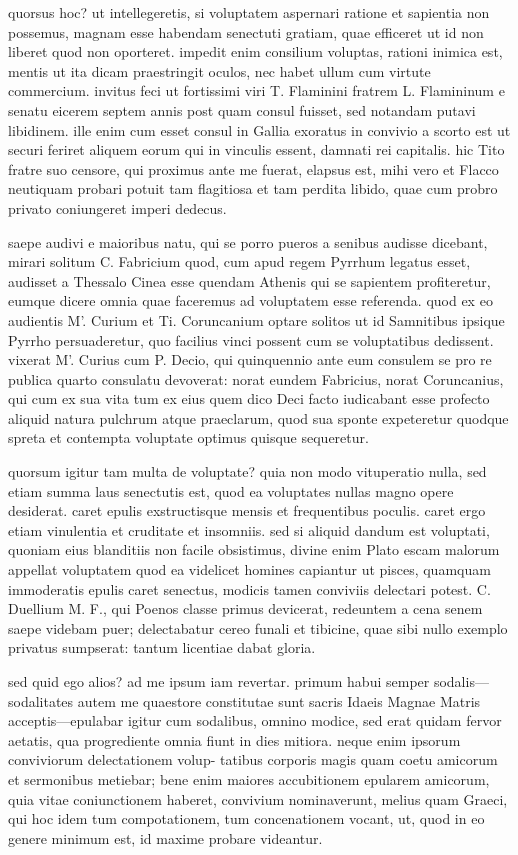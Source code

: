  quorsus hoc? ut intellegeretis, si voluptatem aspernari ratione et sapientia non possemus, magnam esse habendam senectuti gratiam, quae efficeret ut id non liberet quod non oporteret. impedit enim consilium voluptas, rationi inimica est, mentis ut ita dicam praestringit oculos, nec habet ullum cum virtute commercium. invitus feci ut fortissimi viri T. Flaminini fratrem L. Flamininum e senatu eicerem septem annis post quam consul fuisset, sed notandam putavi libidinem. ille enim cum esset consul in Gallia exoratus in convivio a scorto est ut securi feriret aliquem eorum qui in vinculis essent, damnati rei capitalis. hic Tito fratre suo censore, qui proximus ante me fuerat, elapsus est, mihi vero et Flacco neutiquam probari potuit tam flagitiosa et tam perdita libido, quae cum probro privato coniungeret imperi dedecus.

 saepe audivi e maioribus natu, qui se porro pueros a senibus audisse dicebant, mirari solitum C. Fabricium quod, cum apud regem Pyrrhum legatus esset, audisset a Thessalo Cinea esse quendam Athenis qui se sapientem profiteretur, eumque dicere omnia quae faceremus ad voluptatem esse referenda. quod ex eo audientis M'. Curium et Ti. Coruncanium optare solitos ut id Samnitibus ipsique Pyrrho persuaderetur, quo facilius vinci possent cum se voluptatibus dedissent. vixerat M'. Curius cum P. Decio, qui quinquennio ante eum consulem se pro re publica quarto consulatu devoverat: norat eundem Fabricius, norat Coruncanius, qui cum ex sua vita tum ex eius quem dico Deci facto iudicabant esse profecto aliquid natura pulchrum atque praeclarum, quod sua sponte expeteretur quodque spreta et contempta voluptate optimus quisque sequeretur.

 quorsum igitur tam multa de voluptate? quia non modo vituperatio nulla, sed etiam summa laus senectutis est, quod ea voluptates nullas magno opere desiderat. caret epulis exstructisque mensis et frequentibus poculis. caret ergo etiam vinulentia et cruditate et insomniis. sed si aliquid dandum est voluptati, quoniam eius blanditiis non facile obsistimus, divine enim Plato escam malorum appellat voluptatem quod ea videlicet homines capiantur ut pisces, quamquam immoderatis epulis caret senectus, modicis tamen conviviis delectari potest. C. Duellium M. F., qui Poenos classe primus devicerat, redeuntem a cena senem saepe videbam puer; delectabatur cereo funali et tibicine, quae sibi nullo exemplo privatus sumpserat: tantum licentiae dabat gloria.

 sed quid ego alios? ad me ipsum iam revertar. primum habui semper sodalis—sodalitates autem me quaestore constitutae sunt sacris Idaeis Magnae Matris acceptis—epulabar igitur cum sodalibus, omnino modice, sed erat quidam fervor aetatis, qua progrediente omnia fiunt in dies mitiora. neque enim ipsorum conviviorum delectationem volup- tatibus corporis magis quam coetu amicorum et sermonibus metiebar; bene enim maiores accubitionem epularem amicorum, quia vitae coniunctionem haberet, convivium nominaverunt, melius quam Graeci, qui hoc idem tum compotationem, tum concenationem vocant, ut, quod in eo genere minimum est, id maxime probare videantur.

